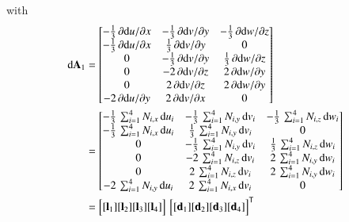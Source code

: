 with
\begin{subequations}
	\begin{align}
    \mathrm{d} \mathbf{A}_1 & =  \begin{bmatrix}
    	-\tfrac{1}{3} \, \partial  \mathrm{d} u / \partial x &  - \tfrac{1}{3} \, \partial  \mathrm{d} v / \partial y & -\tfrac{1}{3} \, \partial  \mathrm{d} w / \partial z  \\
    	-\tfrac{1}{3} \, \partial  \mathrm{d} u / \partial x &  \tfrac{1}{3} \, \partial  \mathrm{d} v / \partial y & 0  \\
    	0  & -\tfrac{1}{3} \, \partial  \mathrm{d} v / \partial y & \tfrac{1}{3} \, \partial  \mathrm{d} w / \partial z \\
    	0 &  - 2 \, \partial  \mathrm{d} v / \partial z &  2 \,  \partial  \mathrm{d} w / \partial y  \\
    	0 &  2 \, \partial  \mathrm{d} v / \partial z  & 2 \,  \partial  \mathrm{d} w / \partial y  \\
    	- 2 \, \partial  \mathrm{d} u / \partial y &   2 \, \partial  \mathrm{d} v / \partial x & 0   \end{bmatrix} \notag\\
	& = \begin{bmatrix} 
	-\tfrac{1}{3} \, \sum\nolimits_{i=1}^4 N_{i,x} \, \mathrm{d} u_i &  - \tfrac{1}{3} \, \sum\nolimits_{i=1}^4 N_{i,y} \, \mathrm{d} v_i & - \tfrac{1}{3} \, \sum\nolimits_{i=1}^4 N_{i,z} \, \mathrm{d} w_i  \\
	-\tfrac{1}{3} \, \sum\nolimits_{i=1}^4 N_{i,x} \, \mathrm{d} u_i &  \tfrac{1}{3} \, \sum\nolimits_{i=1}^4 N_{i,y} \, \mathrm{d} v_i & 0  \\
	0 & -\tfrac{1}{3} \, \sum\nolimits_{i=1}^4 N_{i,y} \, \mathrm{d} v_i & \tfrac{1}{3} \, \sum\nolimits_{i=1}^4 N_{i,z} \, \mathrm{d} w_i \\
	0 &  - 2 \, \sum\nolimits_{i=1}^4 N_{i,z} \, \mathrm{d} v_i & 2 \,  \sum\nolimits_{i=1}^4 N_{i,y} \, \mathrm{d} w_i  \\
	0 & 2 \, \sum\nolimits_{i=1}^4 N_{i,z} \, \mathrm{d} v_i & 2 \,  \sum\nolimits_{i=1}^4 N_{i,y} \, \mathrm{d} w_i  \\
	- 2 \, \sum\nolimits_{i=1}^4 N_{i,y} \, \mathrm{d} u_i &  2 \, \sum\nolimits_{i=1}^4 N_{i,x} \, \mathrm{d} v_i & 0   \end{bmatrix} \notag \\	
	& = \begin{bmatrix}
	[\mathbf{l}_1] [\mathbf{l}_2] [\mathbf{l}_3] [\mathbf{l}_4] 
	\end{bmatrix}   \, \begin{bmatrix} [\mathbf{d}_1] [\mathbf{d}_2] [\mathbf{d}_3] [\mathbf{d}_4] \end{bmatrix}^{\mathsf{T}}

\end{align}
\end{subequations}
